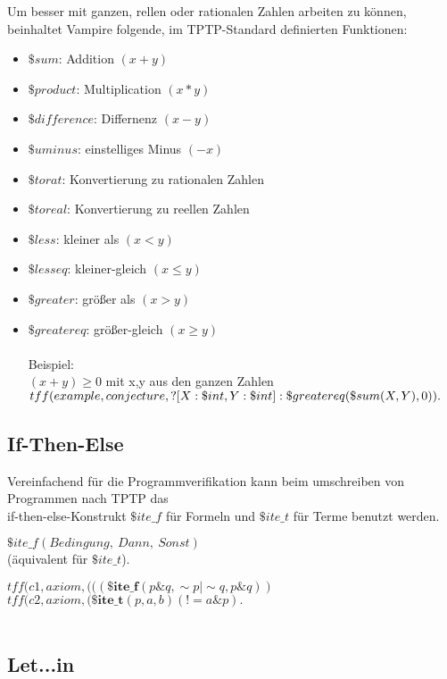 \documentclass{acm_proc_article-sp-german}
\begin{document}
Um besser mit ganzen, rellen oder rationalen Zahlen arbeiten zu können, beinhaltet Vampire folgende, im TPTP-Standard definierten Funktionen:
\begin{itemize}
	\item $\$sum$: Addition $(x + y)$
	\item $\$product$: Multiplication $(x * y)$
	\item $\$difference$: Differnenz $(x - y)$
	\item $\$uminus$: einstelliges Minus $(-x)$
	\item $\$to rat$: Konvertierung zu rationalen Zahlen
	\item $\$to real$: Konvertierung zu reellen Zahlen
	\item $\$less$: kleiner als $(x < y)$
	\item $\$lesseq$: kleiner-gleich $(x \leq y)$
	\item $\$greater$: größer als $(x > y)$
	\item $\$greatereq$: größer-gleich $(x \geq y)$ \\ \\
Beispiel: \\ $(x + y) \geq 0$ mit x,y aus den ganzen Zahlen \\

$tff(example,conjecture, \\ ? [X:\$int,Y:\$int]:
\$greatereq(\$sum(X,Y),0)).$

\end{itemize}

\subsection{If-Then-Else}
\label{subsec:tptpitef}

Vereinfachend für die Programmverifikation kann beim umschreiben von Programmen nach TPTP das \\if-then-else-Konstrukt $ \$ite\_f $ für Formeln und $\$ite\_t$ für Terme benutzt werden.

$\$ite\_f(Bedingung,~Dann,~Sonst)$\\
(äquivalent für $\$ite\_t$).

$tff(c1,axiom,(((\textbf{\$ite\_f}(p\&q,\sim p|\sim q,p\&q))$\\

$tff(c2,axiom,(\textbf{\$ite\_t}(p,a,b)(!=a\&p).$\\ ~\cite{hoder2011slides}

\subsection{Let...in}
\label{subsec:tptpletin}
\end{document}
